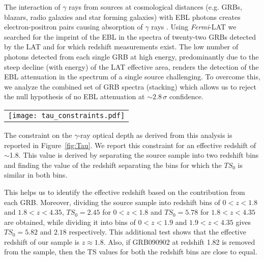 \documentclass[12pt,preprint]{aastex}
\begin{document}
{The interaction of $\gamma$ rays from sources at cosmological distances
(e.g. GRBs, blazars, radio galaxies and star forming galaxies)
with EBL photons creates electron-positron pairs causing absorption of $\gamma$ rays
\citep{stecker06}. Using {\it Fermi}-LAT we searched for the imprint of
the EBL in the spectra of {twenty-two} GRBs detected by the LAT and for which redshift
measurements exist. The low number of photons detected from each single GRB
at high energy, predominantly
due to the steep decline (with energy) of the LAT effective area, renders the detection of
the EBL attenuation in the spectrum of a single source challenging.
To overcome this, we analyze the combined set of GRB 
spectra (stacking) which allows us to reject the null hypothesis 
of no EBL attenuation at $\sim2.8\,\sigma$
confidence. 



\begin{figure*}[ht!]
  \begin{center}
  \begin{tabular}{c}
    \texttt{[image: tau\_constraints.pdf]} 
\end{tabular}
  \end{center}
  \caption{Constraint on the optical depth at a redshift of $z\approx1.8$, at $1\,\sigma$ confidence
    level $(68\%)$, derived for our GRB sample, compared with model estimates.
 {The models of \cite{franceschini08} and \cite[][high and low opacity]{stecker12}, not included in the numerical analysis (mentioned in Sec.~\ref{sec:eblanalysis}), are included in the figure for completeness.}}
\label{fig:Tau}
\end{figure*}

The constraint on the $\gamma$-ray optical depth as derived from this
analysis is reported in Figure~\ref{fig:Tau}. 
We report this constraint for an effective redshift of $\sim$1.8. 
This value is derived by separating the source sample into two redshift bins and finding the value of the redshift separating the bins for which the $TS_0$ is similar in both bins.}
This helps us to identify the effective redshift based on the 
contribution from each GRB. {  Moreover, dividing the source sample into redshift bins of $0<z<1.8$ and $1.8<z<4.35$, $TS_0= 2.45$ for $0<z<1.8$ and $TS_0= 5.78$ for $1.8<z<4.35$ are obtained, while dividing it into bins of $0<z<1.9$ and $1.9<z<4.35$ gives $TS_0= 5.82$ and $2.18$ respectively. This additional test shows that the effective redshift of our sample is $z\approx1.8$. Also, if GRB090902 at redshift 1.82 is removed from the sample, then the TS values for both the redshift bins are close to equal.}
\end{document}
